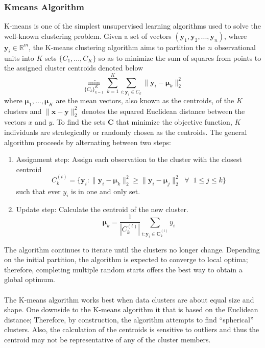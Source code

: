 \documentclass[12pt]{article}
\newcommand{\B}[0]{\mathbf}
\newcommand{\bs}[0]{\boldsymbol}
\begin{document}
\subsubsection{Kmeans Algorithm}
K-means \cite{macqueen1967} is one of the simplest unsupervised learning algorithms used to solve the well-known clustering problem. Given a set of vectors $(\B y_{1},\B y_{2},...,\B y_{n})$, where $\B y_{i}\in\mathbb{R}^{m}$, the K-means clustering algorithm aims to partition the $n$ observational units into $K$ sets $\{C_{1},...,C_{K}\}$ so as to minimize the sum of squares from points to the assigned cluster centroids denoted below
$$\min_{\{C_{k}\}_{k=1}^{K}}\sum_{k=1}^{K}\sum_{i: \B y_{i}\in C_{k}}\|\B y_{i} -\bs \mu_{k}\|_{2}^{2}$$
where $\bs\mu_{1},...,\bs\mu_{K}$ are the mean vectors, also known as the centroids, of the $K$ clusters and $\|\B x-\B y\|_{2}^{2}$ denotes the squared Euclidean distance between the vectors $x$ and $y$. To find the sets $\B C$ that minimize the objective function, $K$ individuals are  strategically or randomly chosen as the centroids. The general algorithm proceeds by alternating between two steps:
\begin{enumerate}
\item Assignment step: Assign each observation to the cluster with the closest centroid
$$ C_{k}^{(t)} = \{\B y_{i}: \|\B y_{i} - \bs\mu_{k}\|_{2}^{2}\geq \|\B y_{i} - \bs\mu_{j}\|_{2}^{2} \;\;\forall\;\; 1\leq j\leq k\}$$
such that ever $y_{i}$ is in one and only set.
\item Update step: Calculate the centroid of the new cluster.
$$\bs\mu_{k} = \frac{1}{|C_{k}^{(t)}|}\sum_{i: \B y_{i}\in\B C_{k}^{(t)}} y_{i}$$
\end{enumerate}
The algorithm continues to iterate until the clusters no longer change. Depending on the initial partition, the algorithm is expected to converge to local optima; therefore, completing multiple random starts offers the best way to obtain a global optimum. \\\\
The K-means algorithm works best when data clusters are about equal size and shape. One downside to the K-means algorithm it that is based on the Euclidean distance; Therefore, by construction, the algorithm attempts to find ``spherical'' clusters. Also, the calculation of the centroids is sensitive to outliers and thus the centroid may not be representative of any of the cluster members.\\\\
\end{document}

